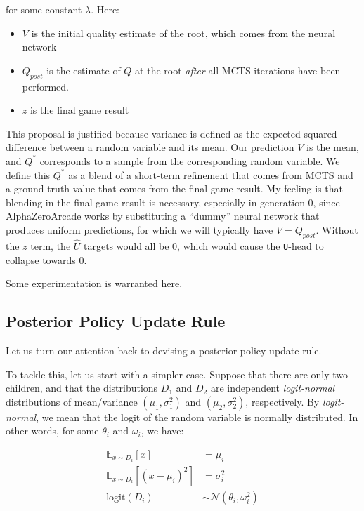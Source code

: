 \documentclass[tikz]{article}
\newcommand{\logit}{\mathrm{logit}}
\begin{document}
for some constant $\lambda$. Here:

\begin{itemize}
    \item $V$ is the initial quality estimate of the root, which comes from the neural network
    \item $Q_{post}$ is the estimate of $Q$ at the root \emph{after} all MCTS iterations have been performed.
    \item $z$ is the final game result
\end{itemize}
This proposal is justified because variance is defined as the expected squared difference between a random variable and its mean.
Our prediction $V$ is the mean, and $Q^*$ corresponds to a sample from the corresponding random variable. We define this $Q^*$
as a blend of a short-term refinement that comes from MCTS and a ground-truth value that comes from the final game result.
My feeling is that blending in the final game result is necessary, especially in generation-0, since AlphaZeroArcade works by
substituting a ``dummy'' neural network that produces uniform predictions, for which we will typically have $V = Q_{post}$.
Without the $z$ term, the $\hat{U}$ targets would all be 0, which would cause the \texttt{U}-head to collapse towards 0. \newline

Some experimentation is warranted here. 

\subsection{Posterior Policy Update Rule}\label{posterior-section}

Let us turn our attention back to devising a posterior policy update rule. \newline

To tackle this, let us start with a simpler case. Suppose that there are only two children, and that the
distributions $D_1$ and $D_2$ are independent \textit{logit-normal} distributions of mean/variance $(\mu_1, \sigma_1^2)$ and $(\mu_2, \sigma_2^2)$, respectively.
By \textit{logit-normal}, we mean that the logit of the random variable is normally distributed. In other words, for some $\theta_i$ and $\omega_i$, we have:

\begin{align*}
\mathbb{E}_{x \sim D_i}[x] &= \mu_i \\
\mathbb{E}_{x \sim D_i}[(x - \mu_i)^2] &= \sigma_i^2 \\
\logit(D_i) &\sim \mathcal{N}(\theta_i, \omega_i^2)
\end{align*}
\end{document}
